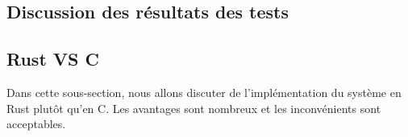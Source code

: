 \subsection{Discussion des résultats des tests}

\subsection{Rust VS C}
Dans cette sous-section, nous allons discuter de l'implémentation du système en Rust plutôt qu'en 
C. Les avantages sont nombreux et les inconvénients sont acceptables.

